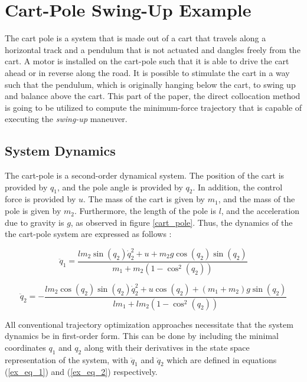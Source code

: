 \documentclass{thesisreport}
\begin{document}
\section{Cart-Pole Swing-Up Example}

The cart pole is a system that is made out of a cart that travels along a horizontal track and a pendulum that is not actuated and dangles freely from the cart. A motor is installed on the cart-pole such that it is able to drive the cart ahead or in reverse along the road. It is possible to stimulate the cart in a way such that the pendulum, which is originally hanging below the cart, to swing up and balance above the cart. This part of the paper, the direct collocation method is going to be utilized to compute the minimum-force trajectory that is capable of executing the \textit{swing-up} maneuver.

\subsection{System Dynamics}

The cart-pole is a second-order dynamical system. The position of the cart is provided by $q_1$, and the pole angle is provided by $q_2$. In addition, the control force is provided by $u$. The mass of the cart is given by $m_1$, and the mass of the pole is given by $m_2$. Furthermore, the length of the pole is $l$, and the acceleration due to gravity is $g$, as observed in figure \ref{cart_pole}. Thus, the dynamics of the the cart-pole system are expressed as follows \cite{Kelly2017}:

\begin{equation}\label{ex_eq_1}
	\ddot{q}_1 =\frac{lm_2 \sin(q_2) \dot{q}_2^2 + u + m_2 g \cos (q_2) \sin(q_2)}{m_1 + m_2(1-\cos^2 (q_2))}
\end{equation}


\begin{equation}\label{ex_eq_2}
	\ddot{q}_2 = - \frac{lm_2 \cos(q_2) \sin (q_2) \dot{q}^2_2 + u \cos (q_2) + (m_1 + m_2) g \sin (q_2)}{lm_1 + lm_2(1-\cos^2 (q_2))}
\end{equation}

All conventional trajectory optimization approaches necessitate that the system dynamics be in first-order form. This can be done by including the minimal coordinates $q_1$ and $q_2$ along with their derivatives in the  state space representation of the system, with $\ddot{q}_1$ and $\ddot{q}_2$ which  are defined in  equations (\ref{ex_eq_1}) and (\ref{ex_eq_2}) respectively.
\end{document}
